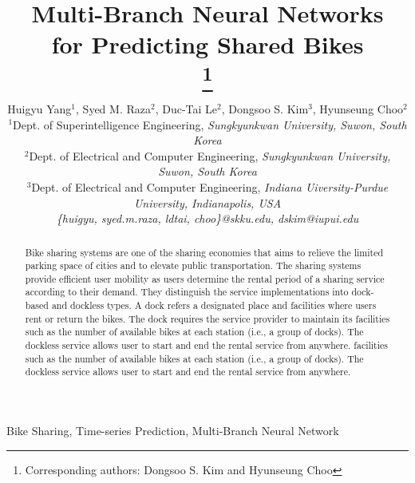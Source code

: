 \documentclass[conference]{IEEEtran}
\begin{document}
\title{Multi-Branch Neural Networks \\for Predicting Shared Bikes\\
\thanks{Corresponding authors: Dongsoo S. Kim and Hyunseung Choo}
}

\author{ Huigyu Yang$^1$, Syed M. Raza$^2$, Duc-Tai Le$^2$, Dongsoo S. Kim$^3$, Hyunseung Choo$^2$\\

$^1$Dept. of Superintelligence Engineering, \textit{Sungkyunkwan University, Suwon, South Korea}\\ 
$^2$Dept. of Electrical and Computer Engineering, \textit{Sungkyunkwan University, Suwon, South Korea}\\
$^3$Dept. of Electrical and Computer Engineering, \textit{Indiana Uiversity-Purdue University, Indianapolis, USA} \\
\textit{\{huigyu, syed.m.raza, ldtai, choo\}@skku.edu, dskim@iupui.edu}}

\maketitle

\begin{abstract}
 Bike sharing systems are one of the sharing economies that aims to relieve the limited parking space of cities and to elevate public transportation. The sharing systems provide efficient user mobility as users determine the rental period of a sharing service according to their demand. They distinguish the service implementations into dock-based and dockless types. A dock refers a designated place and facilities where users rent or return the bikes. The dock requires the service provider to maintain its facilities such as the number of available bikes at each station (i.e., a group of docks). The dockless service allows user to start and end the rental service from anywhere. facilities such as the number of available bikes at each station (i.e., a group of docks). The dockless service allows user to start and end the rental service from anywhere.
\end{abstract}

\begin{IEEEkeywords}
Bike Sharing, Time-series Prediction, Multi-Branch Neural Network
\end{IEEEkeywords}
\end{document}
